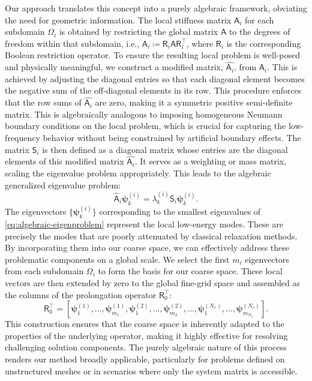 \documentclass[preprint,12pt]{elsarticle}
\begin{document}
  Our approach translates this concept into a purely algebraic framework,
  obviating the need for geometric information. The local stiffness matrix $\mathsf{A}
  _{i}$ for each subdomain $\Omega_{i}$ is obtained by restricting the global matrix
  $\mathsf{A}$ to the degrees of freedom within that subdomain, i.e.,
  $\mathsf{A}_{i}\coloneqq \mathsf{R}_{i}\mathsf{A}\mathsf{R}_{i}^{\intercal}$, where
  $\mathsf{R}_{i}$ is the corresponding Boolean restriction operator. To ensure
  the resulting local problem is well-posed and physically meaningful, we construct
  a modified matrix, $\widehat{\mathsf{A}_i}$, from $\mathsf{A}_{i}$. This is
  achieved by adjusting the diagonal entries so that each diagonal element
  becomes the negative sum of the off-diagonal elements in its row. This procedure
  enforces that the row sums of $\widehat{\mathsf{A}_i}$ are zero, making it a
  symmetric positive semi-definite matrix. This is algebraically analogous to imposing
  homogeneous Neumann boundary conditions on the local problem, which is crucial
  for capturing the low-frequency behavior without being constrained by
  artificial boundary effects. The matrix $\mathsf{S}_{i}$ is then defined as a diagonal
  matrix whose entries are the diagonal elements of this modified matrix $\widehat
  {\mathsf{A}_i}$. It serves as a weighting or mass matrix, scaling the eigenvalue
  problem appropriately. This leads to the algebraic generalized eigenvalue
  problem:
  \begin{equation}
    \label{eq:algebraic-eigenproblem}\widehat{\mathsf{A}}_{i}\boldsymbol{\psi}_{k}
    ^{(i)}= \lambda_{k}^{(i)}\mathsf{S}_{i}\boldsymbol{\psi}_{k}^{(i)}.
  \end{equation}
  The eigenvectors $\{\boldsymbol{\psi}_{k}^{(i)}\}$ corresponding to the smallest
  eigenvalues of \cref{eq:algebraic-eigenproblem} represent the local low-energy
  modes. These are precisely the modes that are poorly attenuated by classical
  relaxation methods. By incorporating them into our coarse space, we can
  effectively address these problematic components on a global scale. We select the
  first $m_{i}$ eigenvectors from each subdomain $\Omega_{i}$ to form the basis for
  our coarse space. These local vectors are then extended by zero to the global
  fine-grid space and assembled as the columns of the prolongation operator
  $\mathsf{R}_{0}^{\intercal}$:
  \begin{equation}
    \mathsf{R}_{0}^{\intercal}= [\boldsymbol{\psi}_{1}^{(1)}, \dots, \boldsymbol{\psi}
    _{m_1}^{(1)}, \boldsymbol{\psi}_{1}^{(2)}, \dots, \boldsymbol{\psi}_{m_2}^{(2)}
    , \dots, \boldsymbol{\psi}_{1}^{(N_c)}, \dots, \boldsymbol{\psi}_{m_{N_c}}^{(N_c)}
    ].
  \end{equation}
  This construction ensures that the coarse space is inherently adapted to the properties
  of the underlying operator, making it highly effective for resolving
  challenging solution components. The purely algebraic nature of this process renders
  our method broadly applicable, particularly for problems defined on
  unstructured meshes or in scenarios where only the system matrix is accessible.
\end{document}
